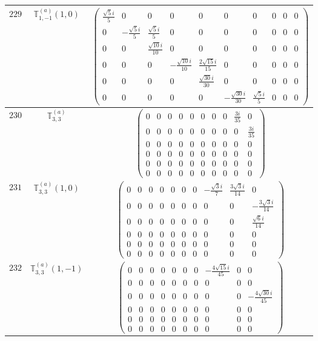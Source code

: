 \documentclass[fleqn,8pt,landscape]{jsarticle}
\begin{document}
\begin{center}
\begin{longtable}{ccc}
$ 229 $ & $ \mathbb{T}_{1,-1}^{(a)}(1,0) $ & $ \begin{pmatrix} \frac{\sqrt{5} i}{5} & 0 & 0 & 0 & 0 & 0 & 0 & 0 & 0 & 0 \\ 0 & - \frac{\sqrt{5} i}{5} & \frac{\sqrt{5} i}{5} & 0 & 0 & 0 & 0 & 0 & 0 & 0 \\ 0 & 0 & \frac{\sqrt{10} i}{10} & 0 & 0 & 0 & 0 & 0 & 0 & 0 \\ 0 & 0 & 0 & - \frac{\sqrt{10} i}{10} & \frac{2 \sqrt{15} i}{15} & 0 & 0 & 0 & 0 & 0 \\ 0 & 0 & 0 & 0 & \frac{\sqrt{30} i}{30} & 0 & 0 & 0 & 0 & 0 \\ 0 & 0 & 0 & 0 & 0 & - \frac{\sqrt{30} i}{30} & \frac{\sqrt{5} i}{5} & 0 & 0 & 0 \end{pmatrix} $ \\ \hline
$ 230 $ & $ \mathbb{T}_{3,3}^{(a)} $ & $ \begin{pmatrix} 0 & 0 & 0 & 0 & 0 & 0 & 0 & 0 & \frac{3 i}{35} & 0 \\ 0 & 0 & 0 & 0 & 0 & 0 & 0 & 0 & 0 & \frac{3 i}{35} \\ 0 & 0 & 0 & 0 & 0 & 0 & 0 & 0 & 0 & 0 \\ 0 & 0 & 0 & 0 & 0 & 0 & 0 & 0 & 0 & 0 \\ 0 & 0 & 0 & 0 & 0 & 0 & 0 & 0 & 0 & 0 \\ 0 & 0 & 0 & 0 & 0 & 0 & 0 & 0 & 0 & 0 \end{pmatrix} $ \\ \hline
$ 231 $ & $ \mathbb{T}_{3,3}^{(a)}(1,0) $ & $ \begin{pmatrix} 0 & 0 & 0 & 0 & 0 & 0 & 0 & - \frac{\sqrt{3} i}{7} & \frac{3 \sqrt{3} i}{14} & 0 \\ 0 & 0 & 0 & 0 & 0 & 0 & 0 & 0 & 0 & - \frac{3 \sqrt{3} i}{14} \\ 0 & 0 & 0 & 0 & 0 & 0 & 0 & 0 & 0 & \frac{\sqrt{6} i}{14} \\ 0 & 0 & 0 & 0 & 0 & 0 & 0 & 0 & 0 & 0 \\ 0 & 0 & 0 & 0 & 0 & 0 & 0 & 0 & 0 & 0 \\ 0 & 0 & 0 & 0 & 0 & 0 & 0 & 0 & 0 & 0 \end{pmatrix} $ \\ \hline
$ 232 $ & $ \mathbb{T}_{3,3}^{(a)}(1,-1) $ & $ \begin{pmatrix} 0 & 0 & 0 & 0 & 0 & 0 & 0 & - \frac{4 \sqrt{15} i}{45} & 0 & 0 \\ 0 & 0 & 0 & 0 & 0 & 0 & 0 & 0 & 0 & 0 \\ 0 & 0 & 0 & 0 & 0 & 0 & 0 & 0 & 0 & - \frac{4 \sqrt{30} i}{45} \\ 0 & 0 & 0 & 0 & 0 & 0 & 0 & 0 & 0 & 0 \\ 0 & 0 & 0 & 0 & 0 & 0 & 0 & 0 & 0 & 0 \\ 0 & 0 & 0 & 0 & 0 & 0 & 0 & 0 & 0 & 0 \end{pmatrix} $ \\ \hline

\end{longtable}
\end{center}
\end{document}

